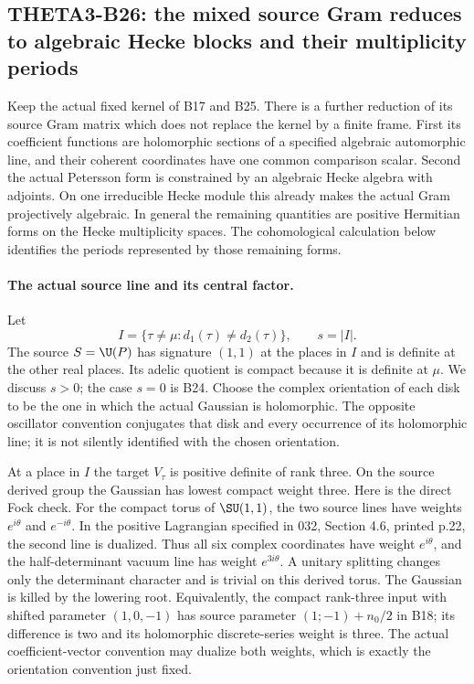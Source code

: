 \subsection{THETA3-B26: the mixed source Gram reduces to algebraic Hecke blocks and their multiplicity periods}\label{B26}

Keep the actual fixed kernel of B17 and B25.  There is a further
reduction of its source Gram matrix which does not replace the
kernel by a finite frame.  First its coefficient functions are
holomorphic sections of a specified algebraic automorphic line,
and their coherent coordinates have one common comparison scalar.
Second the actual Petersson form is constrained by an algebraic
Hecke algebra with adjoints.  On one irreducible Hecke module this
already makes the actual Gram projectively algebraic.  In general
the remaining quantities are positive Hermitian forms on the
Hecke multiplicity spaces.  The cohomological calculation below
identifies the periods represented by those remaining forms.

\paragraph{The actual source line and its central factor.}
Let
\[
 I=\{\tau\ne\mu:d_1(\tau)\ne d_2(\tau)\},\qquad s=|I|.
 \tag{B26a}
\]
The source $S=\U(P)$ has signature $(1,1)$ at the places in $I$
and is definite at the other real places.  Its adelic quotient
is compact because it is definite at $\mu$.  We discuss $s>0$;
the case $s=0$ is B24.  Choose the complex orientation of each
disk to be the one in which the actual Gaussian is holomorphic.
The opposite oscillator convention conjugates that disk and
every occurrence of its holomorphic line; it is not silently
identified with the chosen orientation.

At a place in $I$ the target $V_\tau$ is positive definite of
rank three.  On the source derived group the Gaussian has
lowest compact weight three.  Here is the direct Fock check.
For the compact torus of $\SU(1,1)$, the two source lines have
weights $e^{i\theta}$ and $e^{-i\theta}$.  In the positive
Lagrangian specified in 032, Section 4.6, printed p.22, the
second line is dualized.  Thus all six complex coordinates have
weight $e^{i\theta}$, and the half-determinant vacuum line has
weight $e^{3i\theta}$.  A unitary splitting changes only the
determinant character and is trivial on this derived torus.
The Gaussian is killed by the lowering root.  Equivalently,
the compact rank-three input with shifted parameter $(1,0,-1)$
has source parameter $(1;-1)+n_0/2$ in B18; its difference is
two and its holomorphic discrete-series weight is three.
The actual coefficient-vector convention may dualize both
weights, which is exactly the orientation convention just fixed.


